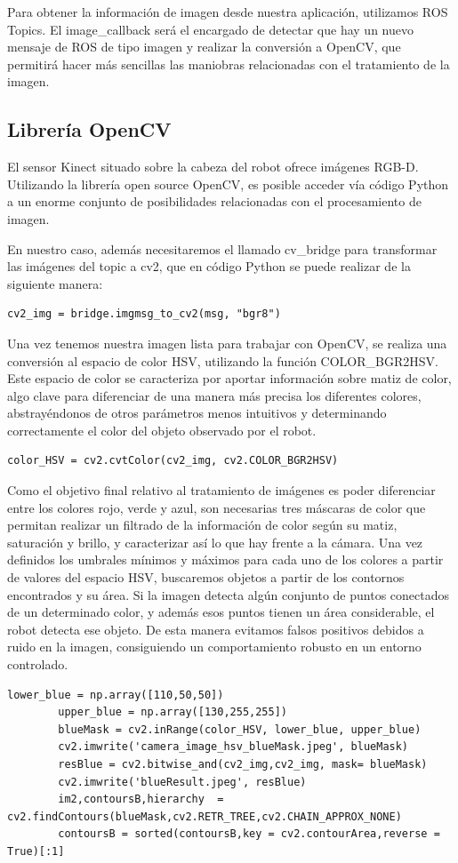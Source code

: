 \documentclass[12pt,spanish,chapterprefix, numbers=noenddot]{book}
\numberwithin{equation}{section}
\numberwithin{figure}{section}
\begin{document}
Para obtener la información de imagen desde nuestra aplicación, utilizamos ROS Topics. El image\_callback será el encargado de detectar que hay un nuevo mensaje de ROS de tipo imagen y realizar la conversión a OpenCV, que permitirá hacer más sencillas las maniobras relacionadas con el tratamiento de la imagen.
\subsection{Librería OpenCV} 
El sensor Kinect situado sobre la cabeza del robot ofrece imágenes RGB-D. Utilizando la librería open source OpenCV, es posible acceder vía código Python a un enorme conjunto de posibilidades relacionadas con el procesamiento de imagen. \cite{open_cv} 

En nuestro caso, además necesitaremos el llamado cv\_bridge para transformar las imágenes del topic a cv2, que en código Python se puede realizar de la siguiente manera: 
	\begin{lstlisting}[frame=single]    
    cv2_img = bridge.imgmsg_to_cv2(msg, "bgr8")
	\end{lstlisting}
Una vez tenemos nuestra imagen lista para trabajar con OpenCV, se realiza una conversión al espacio de color HSV, utilizando la función COLOR\_BGR2HSV. Este espacio de color se caracteriza por aportar información sobre matiz de color, algo clave para diferenciar de una manera más precisa los diferentes colores, abstrayéndonos de otros parámetros menos intuitivos y determinando correctamente el color del objeto observado por el robot. 
	\begin{lstlisting}[frame=single] 
    color_HSV = cv2.cvtColor(cv2_img, cv2.COLOR_BGR2HSV)
	\end{lstlisting}
Como el objetivo final relativo al tratamiento de imágenes es poder diferenciar entre los colores rojo, verde y azul, son necesarias tres máscaras de color que permitan realizar un filtrado de la información de color según su matiz, saturación y brillo, y caracterizar así lo que hay frente a la cámara. 
Una vez definidos los umbrales mínimos y máximos para cada uno de los colores a partir de valores del espacio HSV, buscaremos objetos a partir de los contornos encontrados y su área. Si la imagen detecta algún conjunto de puntos conectados de un determinado color, y además esos puntos tienen un área considerable, el robot detecta ese objeto. De esta manera evitamos falsos positivos debidos a ruido en la imagen, consiguiendo un comportamiento robusto en un entorno controlado. 
\vspace{20pt}
	\begin{lstlisting}[frame=single] 
        lower_blue = np.array([110,50,50])
        upper_blue = np.array([130,255,255])
        blueMask = cv2.inRange(color_HSV, lower_blue, upper_blue)
        cv2.imwrite('camera_image_hsv_blueMask.jpeg', blueMask)
        resBlue = cv2.bitwise_and(cv2_img,cv2_img, mask= blueMask)
        cv2.imwrite('blueResult.jpeg', resBlue)
        im2,contoursB,hierarchy  = cv2.findContours(blueMask,cv2.RETR_TREE,cv2.CHAIN_APPROX_NONE)
        contoursB = sorted(contoursB,key = cv2.contourArea,reverse = True)[:1] 
	\end{lstlisting}
\end{document}
